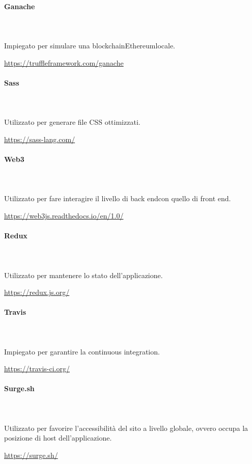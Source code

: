 		\paragraph{Ganache} \mbox{}\\ \mbox{}\\
		Impiegato per simulare una blockchain\glosp Ethereum\glosp locale.\\
		\centerline{\url{https://truffleframework.com/ganache}}
		
		\paragraph{Sass} \mbox{}\\ \mbox{}\\
		Utilizzato per generare file CSS ottimizzati.\\
		\centerline{\url{https://sass-lang.com/}}
		
		\paragraph{Web3} \mbox{}\\ \mbox{}\\
		Utilizzato per fare interagire il livello di back end\glosp con quello di front end\glo. \\
		\centerline{\url{https://web3js.readthedocs.io/en/1.0/}}
		
		\paragraph{Redux} \mbox{}\\ \mbox{}\\
		Utilizzato per mantenere lo stato dell'applicazione.\\
		\centerline{\url{https://redux.js.org/}}
		
		\paragraph{Travis} \mbox{}\\ \mbox{}\\
		Impiegato per garantire la continuous integration.\\
		\centerline{\url{https://travis-ci.org/}}
		
		\paragraph{Surge.sh} \mbox{}\\ \mbox{}\\
		Utilizzato per favorire l'accessibilità del sito a livello globale, ovvero occupa la posizione di host dell'applicazione.\\
		\centerline{\url{https://surge.sh/}}
		
